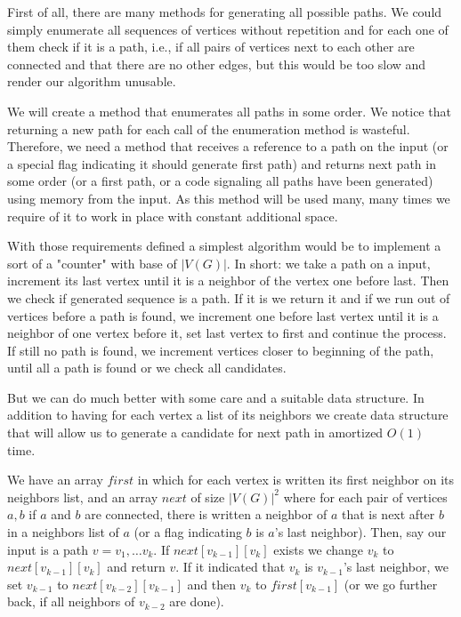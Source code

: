 First of all, there are many methods for generating all possible paths. We could simply enumerate all sequences of vertices without repetition and for each one of them check if it is a path, i.e., if all pairs of vertices next to each other are connected and that there are no other edges, but this would be too slow and render our algorithm unusable.

We will create a method that enumerates all paths in some order. We notice that returning a new path for each call of the enumeration method is wasteful. Therefore, we need a method that receives a reference to a path on the input (or a special flag indicating it should generate first path) and returns next path in some order (or a first path, or a code signaling all paths have been generated) using memory from the input. As this method will be used many, many times we require of it to work in place with constant additional space.

With those requirements defined a simplest algorithm would be to implement a sort of a "counter" with base of $|V(G)|$. In short: we take a path on a input, increment its last vertex until it is a neighbor of the vertex one before last. Then we check if generated sequence is a path. If it is we return it and if we run out of vertices before a path is found, we increment one before last vertex until it is a neighbor of one vertex before it, set last vertex to first and continue the process. If still no path is found, we increment vertices closer to beginning of the path, until all a path is found or we check all candidates.

But we can do much better with some care and a suitable data structure. In addition to having for each vertex a list of its neighbors we create data structure that will allow us to generate a candidate for next path in amortized $O(1)$ time.

We have an array $first$ in which for each vertex is written its first neighbor on its neighbors list, and an array $next$ of size $|V(G)|^2$ where for each pair of vertices $a, b$ if $a$ and $b$ are connected, there is written a neighbor of $a$ that is next after $b$ in a neighbors list of $a$ (or a flag indicating $b$ is $a$'s last neighbor). Then, say our input is a path $v = v_1, \ldots v_k$. If $next[v_{k-1}][v_k]$ exists we change $v_k$ to $next[v_{k-1}][v_k]$ and return $v$. If it indicated that $v_k$ is $v_{k-1}$'s last neighbor, we set $v_{k-1}$ to $next[v_{k-2}][v_{k-1}]$ and then $v_k$ to $first[v_{k-1}]$ (or we go further back, if all neighbors of $v_{k-2}$ are done).

